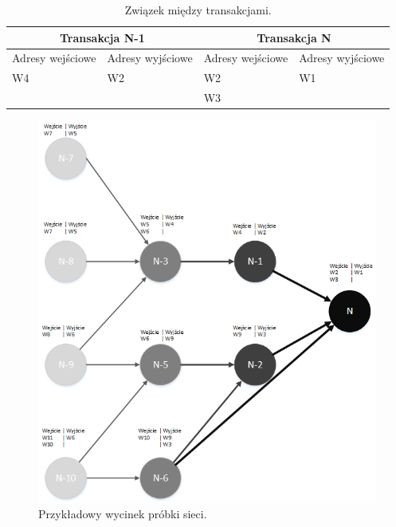 \documentclass[12pt, twoside, final, openany]{mgr}
\begin{document}
\begin{table}[H]
\begin{center}
\caption{Związek między transakcjami.}
\label{tab:zwiazekTransakcji}
\begin{tabular}{|l|l|l|l|}
\hline
	\multicolumn{2}{|c|}{Transakcja N-1} 
   &\multicolumn{2}{|c|}{Transakcja N}  \\
\hline
Adresy wejściowe & Adresy wyjściowe &Adresy wejściowe & Adresy wyjściowe\\
\hline
W4 & W2 & W2 & W1 \\
&& W3 & \\
\hline 
\end{tabular}
\end{center}
\end{table}

\begin{figure}[H]
\begin{center}
\centering
\includegraphics[width=1\linewidth]{pictures/visio/siec.png}
\caption{Przykładowy wycinek próbki sieci.}
\label{fig:siec}
\end{center}
\end{figure}
\end{document}
